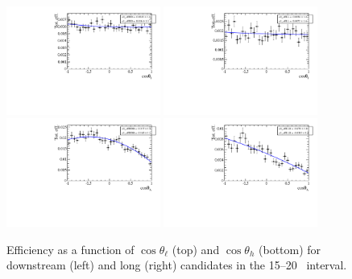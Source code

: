 \begin{figure}[h]
\centering
\includegraphics[width=0.45\textwidth]{Lmumu/figs/efficiencies/angular/DDeffFit_q2_1500_2000.pdf}
\includegraphics[width=0.45\textwidth]{Lmumu/figs/efficiencies/angular/LLeffFit_q2_1500_2000.pdf}
\includegraphics[width=0.45\textwidth]{Lmumu/figs/efficiencies/angular/DDeffFitB_q2_1500_2000.pdf}
\includegraphics[width=0.45\textwidth]{Lmumu/figs/efficiencies/angular/LLeffFitB_q2_1500_2000.pdf}
\caption{Efficiency as a function of $\cos\theta_\ell$ (top) and $\cos\theta_h$ (bottom) for
downstream (left) and long (right) candidates in the 15--20 \gevgevcccc ~\qsq interval.  }
\label{fig:cosThetaBeff}
\end{figure}
%
